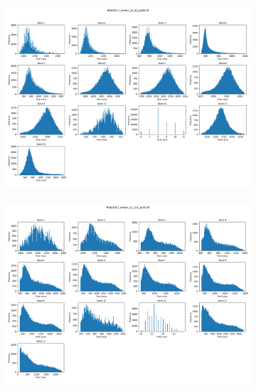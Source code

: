 \begin{figure}[h!]
    \centering
    \begin{subfigure}{0.5\textwidth}
        \centering
        \includegraphics[width=\linewidth]{img/data_ranges/sample_1.png}
        \label{fig:sub1}
    \end{subfigure}
    \hfill
    \begin{subfigure}{0.5\textwidth}
        \centering
        \includegraphics[width=\linewidth]{img/data_ranges/sample_2.png}
        \label{fig:sub2}
    \end{subfigure}


\end{figure}
